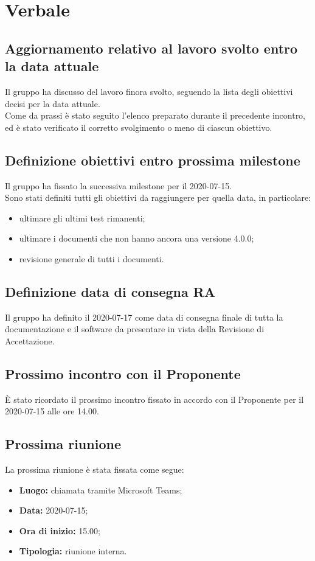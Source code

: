 \section{Verbale}

	\subsection{Aggiornamento relativo al lavoro svolto entro la data attuale}
	Il gruppo ha discusso del lavoro finora svolto, seguendo la lista degli obiettivi decisi per la data attuale. \\
	Come da prassi è stato seguito l'elenco preparato durante il precedente incontro, ed è stato verificato il corretto svolgimento o meno di ciascun obiettivo.
	
	\subsection{Definizione obiettivi entro prossima milestone}
		Il gruppo ha fissato la successiva milestone per il 2020-07-15.\\
		Sono stati definiti tutti gli obiettivi da raggiungere per quella data, in particolare:
		\begin{itemize}
			\item ultimare gli ultimi test rimanenti;
			\item ultimare i documenti che non hanno ancora una versione 4.0.0;
			\item revisione generale di tutti i documenti.
		\end{itemize}
	
	\subsection{Definizione data di consegna RA}
		Il gruppo ha definito il 2020-07-17 come data di consegna finale di tutta la documentazione e il software da presentare in vista della Revisione di Accettazione.
		
	\subsection{Prossimo incontro con il Proponente}
		È stato ricordato il prossimo incontro fissato in accordo con il Proponente per il 2020-07-15 alle ore 14.00.
	
	\subsection{Prossima riunione}
		La prossima riunione è stata fissata come segue:
		\begin{itemize}
			\item \textbf{Luogo:} chiamata tramite Microsoft Teams; 
			\item \textbf{Data:} 2020-07-15;
			\item \textbf{Ora di inizio:} 15.00;
			\item \textbf{Tipologia:} riunione interna.
		\end{itemize}